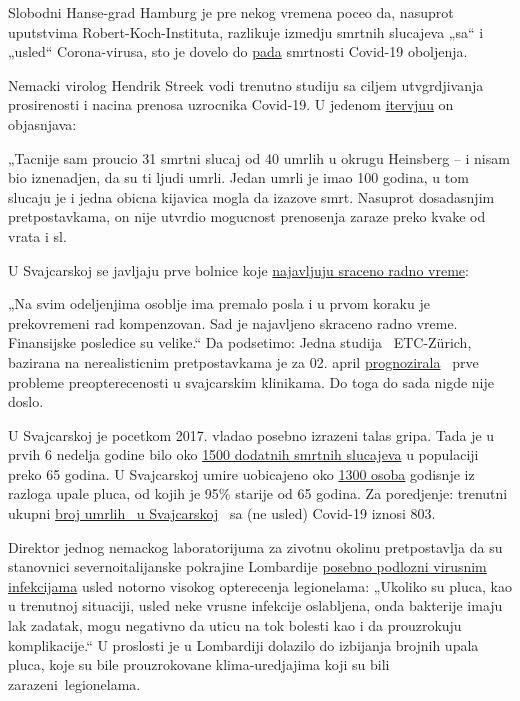 Slobodni Hanse-grad Hamburg je pre nekog vremena poceo da, nasuprot
uputstvima Robert-Koch-Instituta, razlikuje izmedju smrtnih slucajeva
„sa`` i „usled`` Corona-virusa, sto je dovelo do
\href{https://www.t-online.de/nachrichten/deutschland/id_87636856/coronavirus-hamburg-will-nur-echte-covid-19-tote-zaehlen.html}{pada}
smrtnosti Covid-19 oboljenja.

Nemacki virolog Hendrik Streek vodi trenutno studiju sa ciljem
utvgrdjivanja prosirenosti i nacina prenosa uzrocnika Covid-19. U
jedenom
\href{https://www.zeit.de/zustimmung?url=https\%3A\%2F\%2Fwww.zeit.de\%2Fwissen\%2Fgesundheit\%2F2020-04\%2Fhendrik-streeck-covid-19-heinsberg-symptome-infektionsschutz-massnahmen-studie\%2Fkomplettansicht}{itervjuu}
on objasnjava:

„Tacnije sam proucio 31 smrtni slucaj od 40 umrlih u okrugu Heinsberg --
i nisam bio iznenadjen, da su ti ljudi umrli. Jedan umrli je imao 100
godina, u tom slucaju je i jedna obicna kijavica mogla da izazove smrt.
Nasuprot dosadasnjim pretpostavkama, on nije utvrdio mogucnost
prenosenja zaraze preko kvake od vrata i sl.

U Svajcarskoj se javljaju prve bolnice koje
\href{https://www.engadinerpost.ch/2020/4/04/Engadiner-Spitaeler-haben-freie-Kapazitaeten}{najavljuju
sraceno radno vreme}:

„Na svim odeljenjima osoblje ima premalo posla i u prvom koraku je
prekovremeni rad kompenzovan. Sad je najavljeno skraceno radno vreme.
Finansijske posledice su velike.`` Da podsetimo: Jedna studija
~ETC-Zürich, bazirana na nerealisticnim pretpostavkama je za 02. april
\href{https://www.toponline.ch/news/coronavirus/detail/news/studie-bestaetigt-engpass-bei-spitalbetten-steht-kurz-bevor-00131333/}{prognozirala}
~prve probleme preopterecenosti u svajcarskim klinikama. Do toga do sada
nigde nije doslo.

U Svajcarskoj je pocetkom 2017. vladao posebno izrazeni talas gripa.
Tada je u prvih 6 nedelja godine bilo oko
\href{https://www.srf.ch/news/schweiz/todesursachen-statistik-woran-die-meisten-schweizerinnen-und-schweizer-sterben}{1500
dodatnih smrtnih slucajeva} u populaciji preko 65 godina. U Svajcarskoj
umire uobicajeno oko
\href{https://www.nzz.ch/lungenentzuendung-1.4550285}{1300 osoba}
godisnje iz razloga upale pluca, od kojih je 95\% starije od 65 godina.
Za poredjenje: trenutni ukupni \href{https://www.corona-data.ch/}{broj
umrlih ~u Svajcarskoj} ~sa (ne usled) Covid-19 iznosi 803.

Direktor jednog nemackog laboratorijuma za zivotnu okolinu pretpostavlja
da su stanovnici severnoitalijanske pokrajine Lombardije
\href{https://m.apotheke-adhoc.de/nachrichten/detail/coronavirus/erhoehen-legionellen-die-todesrate-einer-corona-infektion/}{posebno
podlozni virusnim infekcijama} usled notorno visokog opterecenja
legionelama: „Ukoliko su pluca, kao u trenutnoj situaciji, usled neke
vrusne infekcije oslabljena, onda bakterije imaju lak zadatak, mogu
negativno da uticu na tok bolesti kao i da prouzrokuju komplikacije.`` U
proslosti je u Lombardiji dolazilo do izbijanja brojnih upala pluca,
koje su bile prouzrokovane klima-uredjajima koji su bili~
zarazeni~legionelama.

